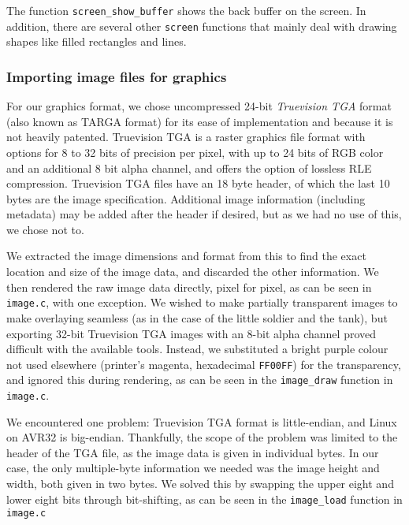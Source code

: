 

The function \texttt{screen\_show\_buffer} shows the back buffer on the
screen. In addition, there are several other \texttt{screen} functions
that mainly deal with drawing shapes like filled rectangles and lines.

\subsubsection{Importing image files for graphics}

For our graphics format, we chose uncompressed 24-bit \emph{Truevision
TGA} format (also known as TARGA format) for its ease of implementation
and because it is not heavily patented. Truevision TGA is a raster
graphics file format with options for 8 to 32 bits of precision per pixel, with up to 24 bits of RGB color and an additional 8 bit alpha channel, and offers the option of lossless RLE compression. Truevision TGA files have an 18 byte header, of which the last 10 bytes are the image specification. Additional image information (including metadata) may be added after the header if desired, but as we had no use of this, we chose not to.

We extracted the image dimensions and format from this to find the exact
location and size of the image data, and discarded the other
information. We then rendered the raw image data directly, pixel for pixel, as can be seen in \texttt{image.c}, with one exception. We wished to make partially transparent images to make overlaying seamless (as in the case of the little soldier and the tank), but exporting 32-bit Truevision TGA images with an 8-bit alpha channel proved difficult with the available tools. Instead, we substituted a bright purple colour not used elsewhere (printer's magenta, hexadecimal \texttt{FF00FF}) for the transparency, and ignored this during rendering, as can be seen in the \texttt{image\_draw} function in \texttt{image.c}.

We encountered one problem: Truevision TGA format is little-endian, and
Linux on AVR32 is big-endian. Thankfully, the scope of the problem was
limited to the header of the TGA file, as the image data is given in
individual bytes. In our case, the only multiple-byte information we
needed was the image height and width, both given in two bytes. We
solved this by swapping the upper eight and lower eight bits through
bit-shifting, as can be seen in the \texttt{image\_load} function in \texttt{image.c}


